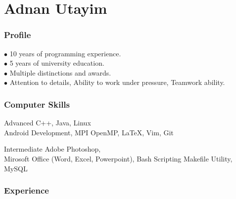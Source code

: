 \documentclass{tccv}
\begin{document}
\part{Adnan Utayim}


\section{Profile}
$\bullet$ 10 years of programming experience. \\
$\bullet$ 5 years of university education. \\
$\bullet$ Multiple distinctions and awards. \\
$\bullet$ Attention to details, Ability to work under pressure, Teamwork ability.


\section{Computer Skills}

\begin{factlist}

\item{Advanced}
     {C++, Java, Linux \\Android Development, MPI OpenMP, \LaTeX, Vim, Git}


\item{Intermediate}
     {Adobe Photoshop,\\ Mirosoft Office (Word, Excel, Powerpoint), Bash Scripting Makefile Utility, MySQL}

\end{factlist}


\section{Experience}
\end{document}
